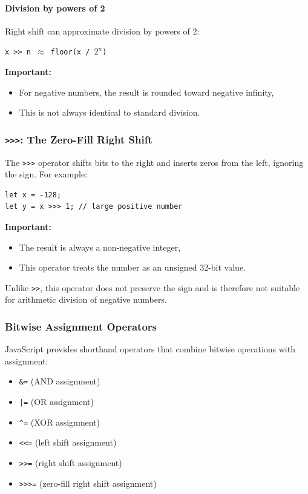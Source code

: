 \documentclass{scrbook}
\begin{document}
\paragraph{Division by powers of 2}

Right shift can approximate division by powers of 2:

\begin{center}
    \texttt{x >> n $\approx$ floor(x / $2^{n}$)}
\end{center}

\textbf{Important:}
\begin{itemize}
    \item For negative numbers, the result is rounded toward negative infinity,
    \item This is not always identical to standard division.
\end{itemize}

\subsubsection{\texttt{>>>}: The Zero-Fill Right Shift}

The \texttt{>>>} operator shifts bits to the right and inserts zeros from the left, ignoring the sign. For example:

\begin{lstlisting}
let x = -128;
let y = x >>> 1; // large positive number
\end{lstlisting}

\textbf{Important:}
\begin{itemize}
    \item The result is always a non-negative integer,
    \item This operator treats the number as an unsigned 32-bit value.
\end{itemize}

Unlike \texttt{>>}, this operator does not preserve the sign and is therefore not suitable for arithmetic division of negative numbers.

\subsubsection{Bitwise Assignment Operators}

JavaScript provides shorthand operators that combine bitwise operations with assignment:

\begin{itemize}
    \item \texttt{\&=} (AND assignment)
    \item \texttt{|=} (OR assignment)
    \item \texttt{\string^=} (XOR assignment)
    \item \texttt{<<=} (left shift assignment)
    \item \texttt{>>=} (right shift assignment)
    \item \texttt{>>>=} (zero-fill right shift assignment)
\end{itemize}
\end{document}
